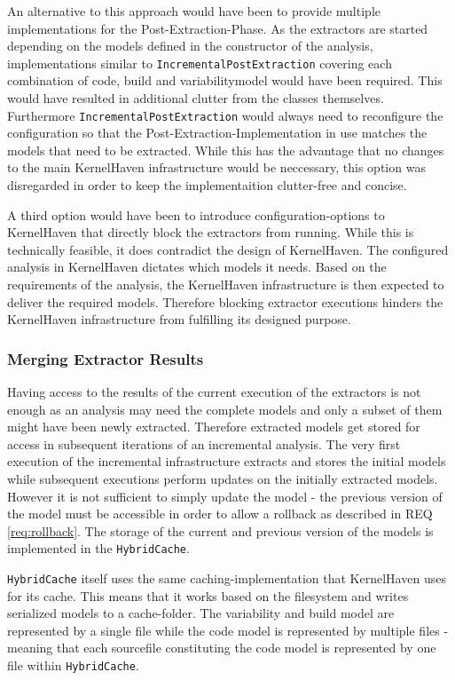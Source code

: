 \documentclass[a4paper]{article}
\begin{document}
An alternative to this approach would have been to provide multiple implementations for the Post-Extraction-Phase. As the extractors are started depending on the models defined in the constructor of the analysis, implementations similar to \texttt{Incremental\-Post\-Extraction} covering each combination of code, build and variabilitymodel would have been required. This would have resulted in additional clutter from the classes themselves. Furthermore \texttt{Incremental\-Post\-Extraction} would always need to reconfigure the configuration so that the Post-Extraction-Implementation in use matches the models that need to be extracted. While this has the advantage that no changes to the main KernelHaven infrastructure would be neccessary, this option was disregarded in order to keep the implementaition clutter-free and concise.

A third option would have been to introduce configuration-options to KernelHaven that directly block the extractors from running. While this is technically feasible, it does contradict the design of KernelHaven. The configured analysis in KernelHaven dictates which models it needs. Based on the requirements of the analysis, the KernelHaven infrastructure is then expected to deliver the required models.  Therefore blocking extractor executions hinders the KernelHaven infrastructure from fulfilling its designed purpose. 

\subsubsection{Merging Extractor Results}

Having access to the results of the current execution of the extractors is not enough as an analysis may need the complete models and only a subset of them might have been newly extracted. Therefore extracted models get stored for access in subsequent iterations of an incremental analysis. The very first execution of the incremental infrastructure extracts and stores the initial models while subsequent executions perform updates on the initially extracted models. However it is not sufficient to simply update the model - the previous version of the model must be accessible in order to allow a rollback as described in REQ \ref{req:rollback}. The storage of the current and previous version of the models is implemented in the \texttt{Hybrid\-Cache}.

\texttt{Hybrid\-Cache} itself uses the same caching-implementation that KernelHaven uses for its cache. This means that it works based on the filesystem and writes serialized models to a cache-folder. The variability and build model are represented by a single file while the code model is represented by multiple files - meaning that each sourcefile constituting the code model is represented by one file within \texttt{Hybrid\-Cache}.
 
\end{document}
